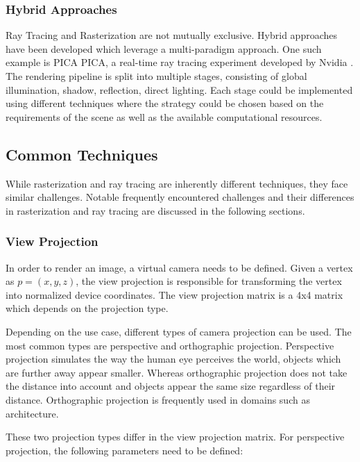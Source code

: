 \subsubsection{Hybrid Approaches}

Ray Tracing and Rasterization are not mutually exclusive. Hybrid approaches have been developed which leverage a multi-paradigm approach. One such example is PICA PICA, a real-time ray tracing experiment developed by Nvidia \cite{hybridRenderingBarreBrisebois2019}. The rendering pipeline is split into multiple stages, consisting of global illumination, shadow, reflection, direct lighting. Each stage could be implemented using different techniques where the strategy could be chosen based on the requirements of the scene as well as the available computational resources.

\subsection{Common Techniques}

While rasterization and ray tracing are inherently different techniques, they face similar challenges. Notable frequently encountered challenges and their differences in rasterization and ray tracing are discussed in the following sections.

\subsubsection{View Projection}

In order to render an image, a virtual camera needs to be defined. Given a vertex as $p = (x, y, z)$, the view projection is responsible for transforming the vertex into normalized device coordinates. The view projection matrix is a 4x4 matrix which depends on the projection type.

Depending on the use case, different types of camera projection can be used. The most common types are perspective and orthographic projection. Perspective projection simulates the way the human eye perceives the world, objects which are further away appear smaller. Whereas orthographic projection does not take the distance into account and objects appear the same size regardless of their distance. Orthographic projection is frequently used in domains such as architecture.

These two projection types differ in the view projection matrix. For perspective projection, the following parameters need to be defined:


